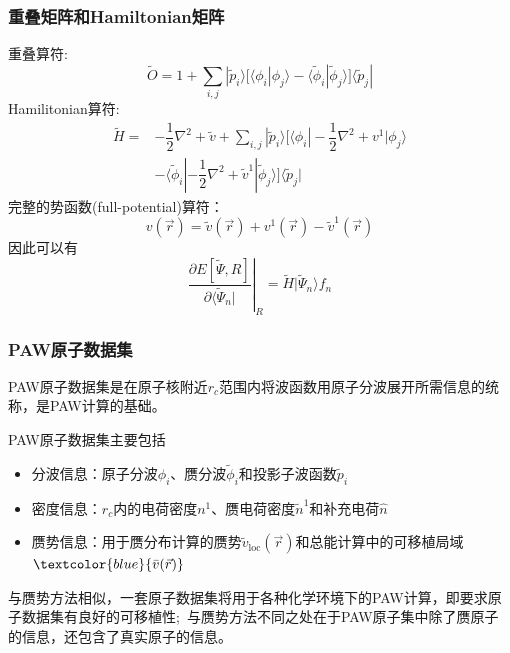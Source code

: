 \frame
{
	\frametitle{重叠矩阵和\textrm{Hamiltonian}矩阵}
重叠算符:
$$\tilde O=1+\sum_{i,j}|\tilde p_i\rangle\bigg[\langle\phi_i|\phi_j\rangle-\langle\tilde\phi_i|\tilde\phi_j\rangle\bigg]\langle\tilde p_j|$$
\textrm{Hamilitonian}算符:
\begin{displaymath}
	\begin{aligned}
		\tilde H=&-\dfrac12\nabla^2+\tilde v+\sum_{i,j}|\tilde p_i\rangle\bigg[\langle\phi_i|-\dfrac12\nabla^2+v^1|\phi_j\rangle\\
			&-\langle\tilde\phi_i|-\dfrac12\nabla^2+\tilde v^1|\tilde\phi_j\rangle\bigg]\langle\tilde p_j| 
	\end{aligned}
\end{displaymath}
	完整的势函数\textrm{(full-potential)}算符：
$$v(\vec r)=\tilde v(\vec r)+v^1(\vec r)-\tilde v^1(\vec r)$$
因此可以有
$$\left.\dfrac{\partial E[\tilde\Psi, R]}{\partial\langle\tilde\Psi_n|}\right|_R=\tilde H|\tilde\Psi_n\rangle f_n$$
}

\frame
{
	\frametitle{\textrm{PAW}原子数据集}
\textrm{PAW}原子数据集是在原子核附近$r_c$范围内将波函数用原子分波展开所需信息的统称，是\textrm{PAW}计算的基础。

\textrm{PAW}原子数据集主要包括
	\begin{itemize}
		\item 分波信息：原子分波$\phi_i$、赝分波$\tilde\phi_i$和投影子波函数$\tilde{p}_i$
		\item 密度信息：$r_c$内的电荷密度$n^1$、赝电荷密度$\tilde n^1$和补充电荷$\hat n$
		\item 赝势信息：用于赝分布计算的赝势$\tilde v_{\textrm{loc}}(\vec r)$和总能计算中的可移植局域$\textcolor{blue}{\bar v(\vec r)}$
	\end{itemize}
	与赝势方法相似，一套原子数据集将用于各种化学环境下的\textrm{PAW}计算，即要求原子数据集有良好的可移植性;~与赝势方法不同之处在于\textrm{PAW}原子集中除了赝原子的信息，还包含了真实原子的信息。
}

